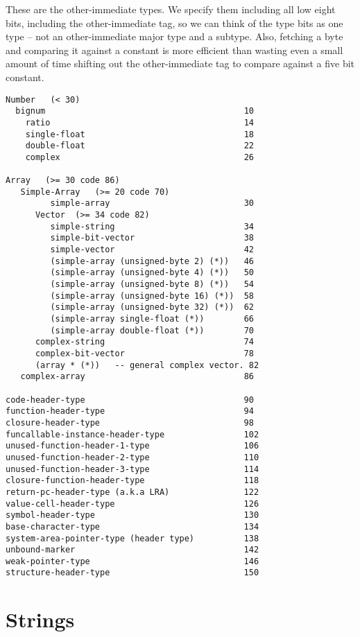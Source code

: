 \label{data-blocks-and-o-i}
These are the other-immediate types.  We specify them including all low eight
bits, including the other-immediate tag, so we can think of the type bits as
one type -- not an other-immediate major type and a subtype.  Also, fetching a
byte and comparing it against a constant is more efficient than wasting even a
small amount of time shifting out the other-immediate tag to compare against a
five bit constant.
\begin{verbatim}
Number   (< 30)
  bignum                                        10
    ratio                                       14
    single-float                                18
    double-float                                22
    complex                                     26

Array   (>= 30 code 86)
   Simple-Array   (>= 20 code 70)
         simple-array                           30
      Vector  (>= 34 code 82)
         simple-string                          34
         simple-bit-vector                      38
         simple-vector                          42
         (simple-array (unsigned-byte 2) (*))   46
         (simple-array (unsigned-byte 4) (*))   50
         (simple-array (unsigned-byte 8) (*))   54
         (simple-array (unsigned-byte 16) (*))  58
         (simple-array (unsigned-byte 32) (*))  62
         (simple-array single-float (*))        66
         (simple-array double-float (*))        70
      complex-string                            74
      complex-bit-vector                        78
      (array * (*))   -- general complex vector. 82
   complex-array                                86

code-header-type                                90
function-header-type                            94
closure-header-type                             98
funcallable-instance-header-type                102
unused-function-header-1-type                   106
unused-function-header-2-type                   110
unused-function-header-3-type                   114
closure-function-header-type                    118
return-pc-header-type (a.k.a LRA)               122
value-cell-header-type                          126
symbol-header-type                              130
base-character-type                             134
system-area-pointer-type (header type)          138
unbound-marker                                  142
weak-pointer-type                               146
structure-header-type                           150
\end{verbatim}

\section{Strings}

